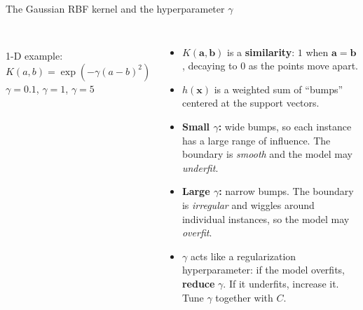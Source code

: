 \documentclass[aspectratio=169,10pt]{beamer}
\newcommand{\x}{\mathbf{x}}
\begin{document}
\begin{frame}{The Gaussian RBF kernel and the hyperparameter $\gamma$}
\begin{columns}[c]
\centering
{}\\[2pt]
\scriptsize 1-D example: $K(a,b)=\exp(-\gamma(a-b)^2)$\\
  {\color{negc}$\gamma=0.1$}, {\color{svc!80!black}$\gamma=1$}, {\color{posc}$\gamma=5$}
\small
\begin{itemize}
  \item $K(\mathbf a,\mathbf b)$ is a \textbf{similarity}: $1$ when $\mathbf a=\mathbf b$, decaying to $0$ as the points move apart.
  \item $h(\x)$ is a weighted sum of ``bumps'' centered at the support vectors.
  \item \textbf{Small $\gamma$:} wide bumps, so each instance has a large range of influence. The boundary is \emph{smooth} and the model may \emph{underfit}.
  \item \textbf{Large $\gamma$:} narrow bumps. The boundary is \emph{irregular} and wiggles around individual instances, so the model may \emph{overfit}.
  \item $\gamma$ acts like a regularization hyperparameter: if the model overfits, \textbf{reduce} $\gamma$. If it underfits, increase it. Tune $\gamma$ together with $C$.
\end{itemize}
\end{columns}
\end{frame}
\end{document}
